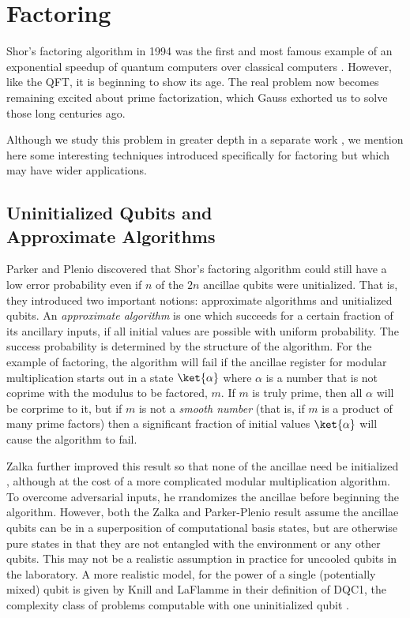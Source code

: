 \section{Factoring}
\label{sec:factor}

Shor's factoring algorithm in 1994 was the first and most famous example of an
exponential speedup of quantum computers over classical computers
\cite{Shor1994}. However, like the QFT, it is beginning to show its age.
The real problem now becomes remaining excited about prime factorization,
which Gauss exhorted us to solve those long centuries ago.

Although we study this problem in greater depth in a separate work
\cite{Pham2012b}, we mention here some interesting techniques introduced
specifically for factoring but which may have wider applications.

\subsection{Uninitialized Qubits and\\ Approximate Algorithms}

Parker and Plenio \cite{Parker2000} discovered that Shor's factoring algorithm
could still have a low error probability even if $n$ of the $2n$ ancillae qubits
were unitialized. That is, they introduced two important notions: approximate
algorithms and unitialized qubits.
An \emph{approximate algorithm} is one which succeeds for a certain fraction of
its ancillary inputs, if all initial values are possible with uniform probability.
The success probability is determined by the structure of the algorithm.
For the example of factoring, the algorithm will fail if the ancillae
register for modular multiplication starts out in a state $\ket{\alpha}$
where $\alpha$ is a number that is not coprime with the modulus to be factored,
$m$. If $m$ is truly prime, then all $\alpha$ will be corprime to it, but
if $m$ is not a \emph{smooth number} (that is, if $m$ is a product of many prime
factors) then a significant fraction of initial values $\ket{\alpha}$ will
cause the algorithm to fail.

Zalka further improved this result so that none of
the ancillae need be initialized \cite{Zalka2006}, although at the cost of
a more complicated modular multiplication algorithm.
To overcome adversarial inputs,
he rrandomizes the ancillae
before beginning the algorithm.
However, both the Zalka and Parker-Plenio result assume the ancillae qubits
can be in a superposition of computational basis states, but are otherwise
pure states in that they are not entangled with the environment or any other
qubits. This may not be a realistic assumption in practice for uncooled
qubits in the laboratory. A more realistic model, for the power of a
single (potentially mixed) qubit is given by Knill and LaFlamme in their
definition of DQC1, the complexity class of problems computable with one
uninitialized qubit \cite{Knill1998}.

